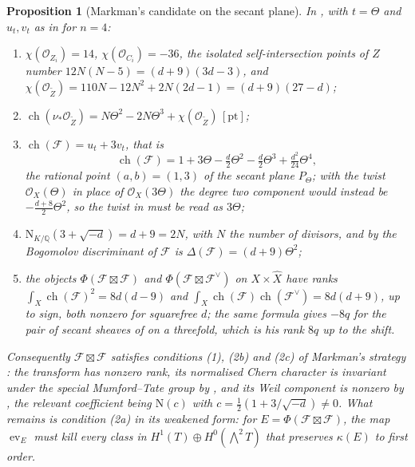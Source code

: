 \documentclass[11pt,reqno]{amsart}
\theoremstyle{plain}
\newtheorem{proposition}[theorem]{Proposition}
\theoremstyle{definition}
\theoremstyle{remark}
\newcommand{\QQ}{\mathbb{Q}}
\newcommand{\cF}{\mathcal{F}}
\newcommand{\cO}{\mathcal{O}}
\newcommand{\Nm}{\mathrm{N}}             %
\DeclareMathOperator{\ch}{ch}
\begin{document}
\begin{proposition}[Markman's candidate on the secant plane]
\label{prop:markman8}
In , with $t=\Theta$ and $u_{t},v_{t}$ as in
\cite[(30)]{paperI} for $n=4$:
\begin{enumerate}[label=\textup{(\roman*)},nosep]
\item $\chi(\cO_{Z_{i}})=14$, $\chi(\cO_{C_{i}})=-36$, the isolated
  self-intersection points of $Z$ number $12N(N-5)=(d+9)(3d-3)$, and
  $\chi(\cO_{\widetilde Z})=110N-12N^{2}+2N(2d-1)=(d+9)(27-d)$;
\item $\ch(\nu_{*}\cO_{\widetilde Z})=N\Theta^{2}-2N\Theta^{3}
  +\chi(\cO_{\widetilde Z})\,[\mathrm{pt}]$;
\item $\ch(\cF)=u_{t}+3v_{t}$, that is
  \[
    \ch(\cF)=1+3\Theta-\tfrac{d}{2}\Theta^{2}-\tfrac{d}{2}\Theta^{3}
      +\tfrac{d^{2}}{24}\Theta^{4},
  \]
  the rational point $(a,b)=(1,3)$ of the secant plane $P_{\Theta}$; with
  the twist $\cO_{X}(\Theta)$ in place of $\cO_{X}(3\Theta)$ the degree two
  component would instead be $-\tfrac{d+8}{2}\Theta^{2}$, so the twist in
  \cite[Section 12]{Mar25b} must be read as $3\Theta$;
\item $\Nm_{K/\QQ}(3+\sqrt{-d})=d+9=2N$, with $N$ the number of divisors, and by
  \cite[Theorem~14.7]{paperI} the Bogomolov discriminant of $\cF$ is
  $\Delta(\cF)=(d+9)\Theta^{2}$;
\item the objects $\Phi(\cF\boxtimes\cF)$ and $\Phi(\cF\boxtimes\cF^{\vee})$
  on $X\times\widehat X$ have ranks
  $\int_{X}\ch(\cF)^{2}=8d(d-9)$ and
  $\int_{X}\ch(\cF)\ch(\cF^{\vee})=8d(d+9)$, up to sign, both nonzero for
  squarefree $d$; the same formula gives $-8q$ for the pair of secant sheaves
  of \cite[Section 11]{Mar25b} on a threefold, which is his rank $8q$ up to
  the shift.
\end{enumerate}
Consequently $\cF\boxtimes\cF$ satisfies conditions (1), (2b) and (2c) of
Markman's strategy \cite[Section 4]{Mar25b}: the transform has nonzero rank,
its normalised Chern character is invariant under the special Mumford--Tate
group by \cite[Corollary 9.2]{Mar25b}, and its Weil component is nonzero by
\cite[Proposition 10.2]{Mar25b}, the relevant coefficient being
$\Nm(c)$ with $c=\tfrac12(1+3/\sqrt{-d})\ne0$. What remains is condition
(2a) in its weakened form: for $E=\Phi(\cF\boxtimes\cF)$, the map
$\operatorname{ev}_{E}$ must kill every class in
$H^{1}(T)\oplus H^{0}(\bigwedge^{2}T)$ that preserves $\kappa(E)$ to first
order.
\end{proposition}
\end{document}
